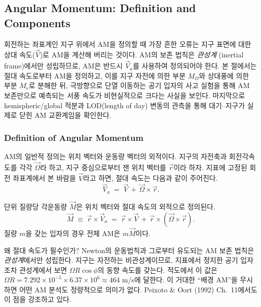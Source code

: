 \subsection{Angular Momentum: Definition and Components}

회전하는 좌표계인 지구 위에서 AM을 정의할 때 가장 흔한 오류는 지구 표면에 대한
상대 속도($\vec{V}$)로 AM을 계산해 버리는 것이다.  AM의 보존 법칙은 \emph{관성계}
(inertial frame)에서만 성립하므로, AM은 반드시 
$\vec{V}_a$를 사용하여 정의되어야 한다.  본 절에서는 절대 속도로부터 AM을 정의하고,
이를 지구 자전에 의한 부분 $M_\Omega$와 상대풍에 의한 부분 $M_r$로 분해한 뒤,
극방향으로 단열 이동하는 공기 입자의 사고 실험을 통해 AM 보존만으로 예측되는
서풍 속도가 비현실적으로 크다는 사실을 보인다.  마지막으로 hemispheric/global
적분과 LOD(length of day) 변동의 관측을 통해 대기--지구가 실제로 닫힌 AM
교환계임을 확인한다.

\subsubsection{Definition of Angular Momentum}

AM의 일반적 정의는 위치 벡터와 운동량 벡터의 외적이다.  지구의 자전축과 회전각속도를
각각 $\vec{\Omega}$라 하고, 지구 중심으로부터 잰 위치 벡터를 $\vec{r}$이라 하자.
지표에 고정된 회전 좌표계에서 본 바람을 $\vec{V}$라고 하면, 절대 속도는
다음과 같이 주어진다.
\begin{equation}\label{eq:ch07_am_absvel}
  \vec{V}_a \;=\; \vec{V} \,+\, \vec{\Omega}\times\vec{r}.
\end{equation}

\begin{definition}\label{def:ch07_am_basic}
단위 질량당 각운동량 $\vec{M}$은 위치 벡터와 절대 속도의 외적으로 정의된다.
\begin{equation}\label{eq:ch07_am_def}
  \boxed{\;\vec{M} \;\equiv\; \vec{r}\times\vec{V}_a
       \;=\; \vec{r}\times\vec{V} \,+\, \vec{r}\times(\vec{\Omega}\times\vec{r}).\;}
\end{equation}
질량 $m$을 갖는 입자의 경우 전체 AM은 $m\vec{M}$이다.
\end{definition}


\begin{hisublock}
왜 절대 속도가 필수인가?  Newton의 운동법칙과 그로부터 유도되는 AM 보존 법칙은
\emph{관성계}에서만 성립한다.  지구는 자전하는 비관성계이므로, 지표에서 정지한
공기 입자조차 관성계에서 보면 $\Omega R \cos\phi$의 동향 속도를 갖는다.  적도에서
이 값은 $\Omega R = 7.292\times 10^{-5} \times 6.37\times 10^6 \approx 464$ m/s에
달한다.  이 거대한 ``배경 AM''을 무시하면 어떤 AM 분석도 정량적으로 의미가 없다.
Peixoto \& Oort (1992) Ch.~11에서도 이 점을 강조하고 있다.
\end{hisublock}

